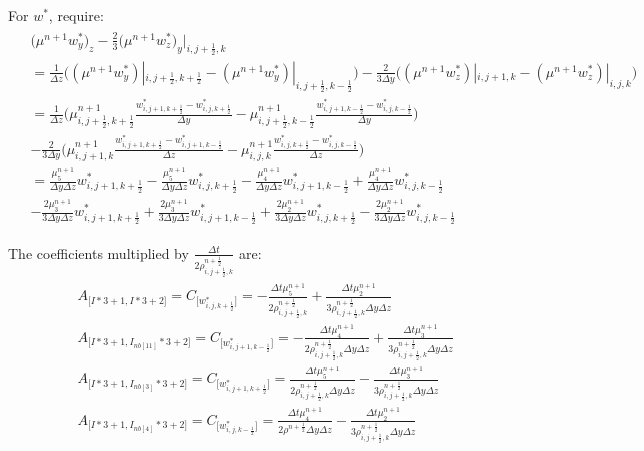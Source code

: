 \documentclass{article}
\numberwithin{equation}{subsection}
\begin{document}
For $w^*$, require:
\begin{align}
\begin{split}
& \Big(\mu^{n+1}w^*_y \Big)_z - \frac{2}{3} \Big( \mu^{n+1}w^*_z \Big)_y |_{i,j+\frac{1}{2},k} \\
& = \frac{1}{\Delta z} \Big((\mu^{n+1}w^*_y)|_{i,j+\frac{1}{2},k+\frac{1}{2}} - (\mu^{n+1}w^*_y)|_{i,j+\frac{1}{2},k-\frac{1}{2}}\Big) - \frac{2}{3\Delta y} \Big( (\mu^{n+1}w^*_z)|_{i,j+1,k} - (\mu^{n+1}w^*_z)|_{i,j,k}\Big) \\
& = \frac{1}{\Delta z} \Big(\mu^{n+1}_{i,j+\frac{1}{2},k+\frac{1}{2}}\frac{w^*_{i,j+1,k+\frac{1}{2}} - w^*_{i,j,k+\frac{1}{2}}}{\Delta y} - \mu^{n+1}_{i,j+\frac{1}{2},k-\frac{1}{2}}\frac{w^*_{i,j+1,k-\frac{1}{2}}-w^*_{i,j,k-\frac{1}{2}}}{\Delta y}\Big) \\
& - \frac{2}{3\Delta y}\Big(\mu^{n+1}_{i,j+1,k}\frac{w^*_{i,j+1,k+\frac{1}{2}} - w^*_{i,j+1,k-\frac{1}{2}}}{\Delta z} - \mu^{n+1}_{i,j,k}\frac{w^*_{i,j,k+\frac{1}{2}} - w^*_{i,j,k-\frac{1}{2}}}{\Delta z} \Big) \\
& = \frac{\mu^{n+1}_5}{\Delta y \Delta z}w^*_{i,j+1,k+\frac{1}{2}} -\frac{\mu^{n+1}_5}{\Delta y \Delta z}w^*_{i,j,k+\frac{1}{2}} - \frac{\mu^{n+1}_4}{\Delta y \Delta z}w^*_{i,j+1,k-\frac{1}{2}} + \frac{\mu^{n+1}_4}{\Delta y \Delta z} w^*_{i,j,k-\frac{1}{2}} \\
& - \frac{2\mu^{n+1}_3}{3\Delta y \Delta z}w^*_{i,j+1,k+\frac{1}{2}} + \frac{2\mu^{n+1}_3}{3\Delta y \Delta z}w^*_{i,j+1,k-\frac{1}{2}} + \frac{2\mu^{n+1}_2}{3\Delta y \Delta z}w^*_{i,j,k+\frac{1}{2}} -\frac{2\mu^{n+1}_2}{3\Delta y \Delta z}w^*_{i,j,k-\frac{1}{2}}
\end{split}
\end{align}

The coefficients multiplied by $\frac{\Delta t}{2\rho^{n+\frac{1}{2}}_{i,j+\frac{1}{2},k}}$ are:
\begin{align}
\begin{split}
& A_{\Big[I*3+1,I*3+2\Big]} = C_{\Big[w^*_{i,j,k+\frac{1}{2}}\Big]} = -\frac{\Delta t \mu^{n+1}_5}{2\rho^{n+\frac{1}{2}}_{i,j+\frac{1}{2},k}} + \frac{\Delta t \mu^{n+1}_2}{3\rho^{n+\frac{1}{2}}_{i,j+\frac{1}{2},k}\Delta y \Delta z}\\
& A_{\Big[I*3+1,I_{nb[11]}*3+2\Big]} = C_{\Big[w^*_{i,j+1,k-\frac{1}{2}}\Big]} = -\frac{\Delta t \mu^{n+1}_4}{2\rho^{n+\frac{1}{2}}_{i,j+\frac{1}{2},k}\Delta y \Delta z} + \frac{\Delta t \mu^{n+1}_3}{3\rho^{n+\frac{1}{2}}_{i,j+\frac{1}{2},k}\Delta y \Delta z} \\
& A_{\Big[I*3+1,I_{nb[3]}*3+2\Big]} = C_{\Big[w^*_{i,j+1,k+\frac{1}{2}}\Big]} = \frac{\Delta t \mu^{n+1}_5}{2\rho^{n+\frac{1}{2}}_{i,j+\frac{1}{2},k}\Delta y \Delta z} - \frac{\Delta t \mu^{n+1}_3}{3\rho^{n+\frac{1}{2}}_{i,j+\frac{1}{2},k}\Delta y \Delta z}\\
& A_{\Big[I*3+1,I_{nb[4]}*3+2\Big]} = C_{\Big[w^*_{i,j,k-\frac{1}{2}}\Big]} = \frac{\Delta t \mu^{n+1}_4}{2\rho^{n+\frac{1}{2}}\Delta y \Delta z} - \frac{\Delta t \mu^{n+1}_2}{3\rho^{n+\frac{1}{2}}_{i,j+\frac{1}{2},k}\Delta y \Delta z}
\end{split}
\end{align}
\end{document}
